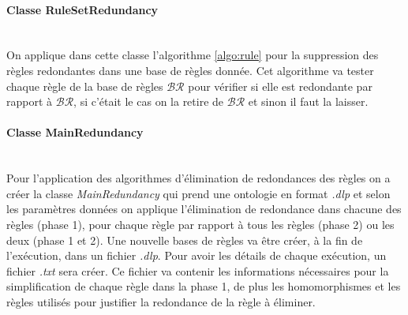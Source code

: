     \paragraph{Classe RuleSetRedundancy}\ \\
         On applique dans cette classe l'algorithme \ref{algo:rule} pour la suppression des règles redondantes dans une base de règles donnée. Cet algorithme va tester chaque règle de la base de règles $\mathcal{BR}$ pour vérifier si elle est redondante par rapport à $\mathcal{BR}$, si c'était le cas on la retire de $\mathcal{BR}$ et sinon il faut la laisser.
         
    \paragraph{Classe MainRedundancy}\ \\
         Pour l'application des algorithmes d'élimination de redondances des règles on a créer la classe \textit{MainRedundancy} qui prend une ontologie en format \textit{.dlp} et selon les paramètres données on applique l'élimination de redondance dans chacune des règles (phase 1), pour chaque règle par rapport à tous les règles (phase 2) ou les deux (phase 1 et 2). Une nouvelle bases de règles va être créer, à la fin de l'exécution, dans un fichier \textit{.dlp}. Pour avoir les détails de chaque exécution, un fichier \textit{.txt} sera créer. Ce fichier va contenir les informations nécessaires pour la simplification de chaque règle dans la phase 1, de plus les homomorphismes et les règles utilisés pour justifier la redondance de la règle à éliminer.
